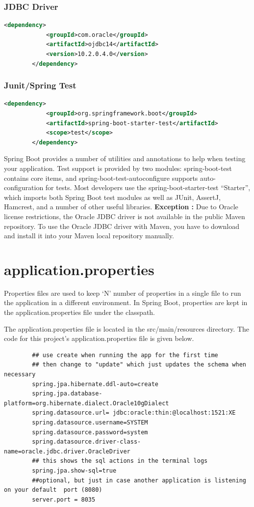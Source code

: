 \documentclass{report}
\begin{document}
	\subsubsection{JDBC Driver}
		\begin{lstlisting}[language=xml]
		<dependency>
			<groupId>com.oracle</groupId>
			<artifactId>ojdbc14</artifactId>
			<version>10.2.0.4.0</version>
		</dependency>
		\end{lstlisting}
	\subsubsection{Junit/Spring Test}
		\begin{lstlisting}[language=xml]
		<dependency>
			<groupId>org.springframework.boot</groupId>
			<artifactId>spring-boot-starter-test</artifactId>
			<scope>test</scope>
		</dependency>
		\end{lstlisting}
		Spring Boot provides a number of utilities and annotations to help when testing your 	application. Test support is provided by two modules: spring-boot-test contains core 	items, and spring-boot-test-autoconfigure supports auto-configuration for tests.
		Most developers use the spring-boot-starter-test “Starter”, which imports both 	Spring Boot test modules as well as JUnit, AssertJ, Hamcrest, and a number of other useful 	libraries.
		\newline
		\newline
		\textbf{Exception : }
		Due to Oracle license restrictions, the Oracle JDBC driver is not available in the public Maven repository. To use the Oracle JDBC driver with Maven, you have to download and install it into your Maven local repository manually. 	
	\newpage
	\section{application.properties}
	Properties files are used to keep ‘N’ number of properties in a single file to run the application in a different environment. In Spring Boot, properties are kept in the application.properties file under the classpath.
	\par The application.properties file is located in the src/main/resources directory. The code for this project’s application.properties file is given below.
	\begin{lstlisting}
		## use create when running the app for the first time
		## then change to "update" which just updates the schema when necessary
		spring.jpa.hibernate.ddl-auto=create
		spring.jpa.database-platform=org.hibernate.dialect.Oracle10gDialect
		spring.datasource.url= jdbc:oracle:thin:@localhost:1521:XE
		spring.datasource.username=SYSTEM
		spring.datasource.password=system
		spring.datasource.driver-class-name=oracle.jdbc.driver.OracleDriver
		## this shows the sql actions in the terminal logs
		spring.jpa.show-sql=true
		##optional, but just in case another application is listening on your default  port (8080)
		server.port = 8035
	\end{lstlisting}
\end{document}

